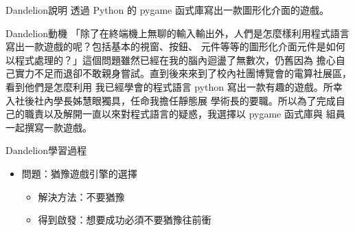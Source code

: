 \documentclass{article}
\begin{document}

\begin{large}
\begin{boxpar}{Dandelion}{說明}
透過 Python 的 pygame 函式庫寫出一款圖形化介面的遊戲。
\end{boxpar}
\begin{boxpar}{Dandelion}{動機}
「除了在終端機上無聊的輸入輸出外，人們是怎麼樣利用程式語言寫出一款遊戲的呢？包括基本的視窗、按鈕、
    元件等等的圖形化介面元件是如何以程式處理的？」這個問題雖然已經在我的腦內迴盪了無數次，仍舊因為
    擔心自己實力不足而退卻不敢親身嘗試。直到後來來到了校內社團博覽會的電算社展區，看到他們是怎麼利用
    我已經學會的程式語言 python 寫出一款有趣的遊戲。所幸入社後社內學長姊慧眼獨具，任命我擔任靜態展
    學術長的要職。所以為了完成自己的職責以及解開一直以來對程式語言的疑惑，我選擇以 pygame 函式庫與
    組員一起撰寫一款遊戲。
\end{boxpar}
    \begin{boxpar}{Dandelion}{學習過程}
\begin{itemize}
    \item 問題：猶豫遊戲引擎的選擇
        \begin{itemize}
            \item 解決方法：不要猶豫
            \item 得到啟發：想要成功必須不要猶豫往前衝
        \end{itemize}


\end{itemize}
\end{boxpar}
\end{large}
\end{document}

